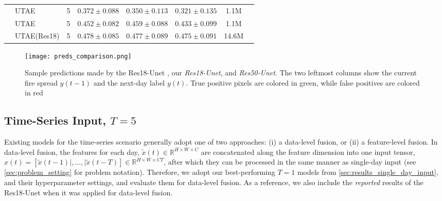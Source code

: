 \begin{table*}[h]
\begin{tabular}{clcccccc}
                              &  UTAE\cite{gerard2023wildfirespreadts} & 5 & $0.372 \pm 0.088$ & $0.350 \pm 0.113$ & $0.321 \pm 0.135$ & 1.1M \\
                              &  UTAE & 5 & $0.452 \pm 0.082$ & $0.459 \pm 0.088$ & $0.433 \pm 0.099$ & 1.1M \\
                              &  UTAE(Res18) & 5 & $\mathbf{0.478 \pm 0.085}$ & $\mathbf{0.477 \pm 0.089}$ & $\mathbf{0.475 \pm 0.091}$ & 14.6M \\
                              
        \bottomrule
    \end{tabular}
    \label{tab:results}
\end{table*}

\begin{figure}
    \centering
    \texttt{[image: preds\_comparison.png]}
    \caption{Sample predictions made by the Res18-Unet \cite{gerard2023wildfirespreadts}, our \textit{Res18-Unet}, and \textit{Res50-Unet}. The two leftmost columns show the current fire spread $y(t-1)$ and the next-day label $y(t)$. True positive pixels are colored in green, while false positives are colored in red}
    \label{fig:example_predictions}
\end{figure}



\subsection{Time-Series Input, $T=5$}

Existing models for the time-series scenario generally adopt one of two approaches: (i) a data-level fusion, or (ii) a feature-level fusion.  In data-level fusion, the features for each day, $\tilde{x}(t) \in \mathbb{R}^{H \times W \times C}$ are concatenated along the feature dimension into one input tensor, $x(t)= [ \tilde{x}(t-1) |, ... ,| \tilde{x}(t-T) ] \in \mathbb{R}^{H \times W \times CT}$, after which they can be processed in the same manner as single-day input (see \cref{sec:problem_setting} for problem notation).  Therefore, we adopt our best-performing $T=1$ models from \cref{sec:results_single_day_input}, and their hyperparameter settings, and evaluate them for data-level fusion.  As a reference, we also include the \textit{reported} results of the Res18-Unet \cite{gerard2023wildfirespreadts} when it was applied for data-level fusion.   

